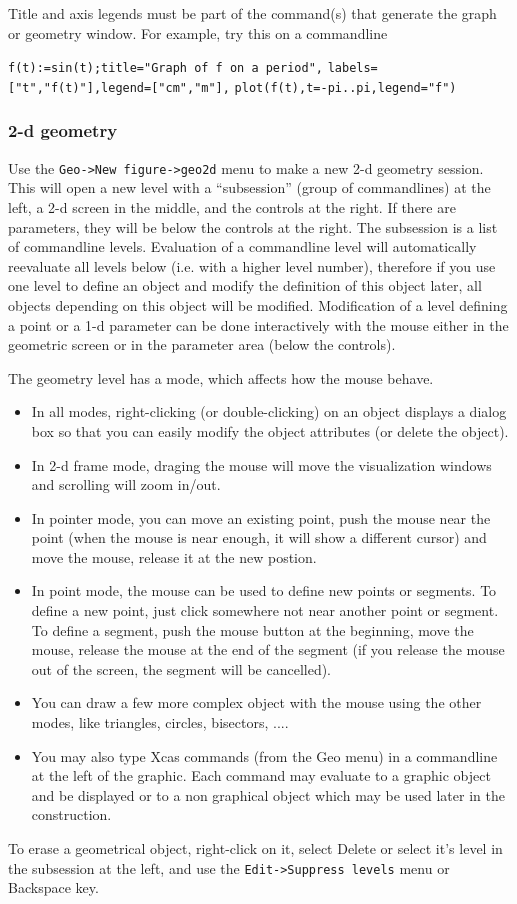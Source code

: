 \documentclass{article}
\begin{document}
Title and axis legends must be part of the command(s) that generate
the graph or geometry window. For example, try this on a commandline
\begin{center}
\verb|f(t):=sin(t);title="Graph of f on a period",|
\verb|labels=["t","f(t)"],legend=["cm","m"],|
\verb|plot(f(t),t=-pi..pi,legend="f")|
\end{center}

\subsubsection{2-d geometry}
Use the \verb|Geo->New figure->geo2d| menu to make a new 2-d geometry
session. This will open a new level with a ``subsession'' (group of
commandlines) at the left,
a 2-d screen in the middle, and the controls at the right. If there
are parameters, they will be below the controls at the right.
The subsession is a list of commandline levels. Evaluation of
a commandline level will automatically reevaluate all levels
below (i.e. with a higher level number), therefore if you use
one level to define an object and modify the definition of this
object later, all objects depending on this object will be modified.
Modification of a level defining a point or a 1-d parameter can be
done interactively with the mouse either in the geometric screen or in the
parameter area (below the controls).

The geometry level has a mode, which affects how the mouse behave.
\begin{itemize}
\item In all modes, right-clicking (or double-clicking) on an object
displays a dialog box so that you can easily modify the object
attributes (or delete the object).
\item In 2-d frame mode, draging the mouse will move the visualization windows
and scrolling will zoom in/out.
\item In pointer mode, you can move an existing point, push the mouse 
near the point (when the mouse is near enough, it will show
a different cursor) and move the mouse, release it at the
new postion.
\item In point mode, the mouse can be used to define new
points or segments. To define a new
point, just click somewhere not near another point or segment. To
define a segment, push the mouse button at the beginning, move
the mouse, release the mouse at the end of the segment (if
you release the mouse out of the screen, the segment will be
cancelled). 
\item You can draw a few more complex object with the mouse using
the other modes, like triangles, circles, bisectors, .... 
\item You may also type Xcas commands (from the Geo menu)
in a commandline at the left of the graphic. Each command may evaluate
to a graphic object and be displayed or to a non graphical object which
may be used later in the construction.
\end{itemize}
To erase a geometrical object, right-click on it, select Delete
or select it's level in the
subsession at the left, and use the \verb|Edit->Suppress levels|
menu or Backspace key.
\end{document}
